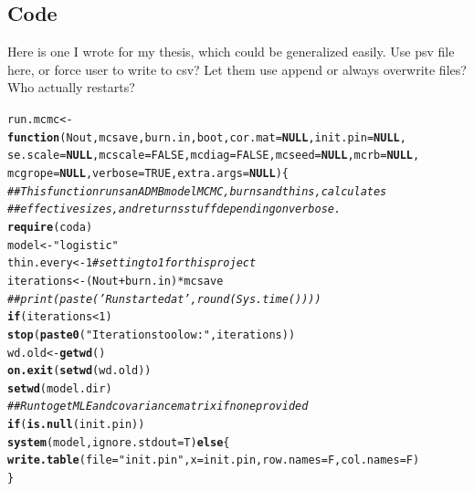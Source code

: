 \documentclass{article}\usepackage[]{graphicx}\usepackage[]{color}
\makeatletter
\newcommand{\hlnum}[1]{\textcolor[rgb]{0.686,0.059,0.569}{#1}}%
\newcommand{\hlstr}[1]{\textcolor[rgb]{0.192,0.494,0.8}{#1}}%
\newcommand{\hlcom}[1]{\textcolor[rgb]{0.678,0.584,0.686}{\textit{#1}}}%
\newcommand{\hlopt}[1]{\textcolor[rgb]{0,0,0}{#1}}%
\newcommand{\hlstd}[1]{\textcolor[rgb]{0.345,0.345,0.345}{#1}}%
\newcommand{\hlkwa}[1]{\textcolor[rgb]{0.161,0.373,0.58}{\textbf{#1}}}%
\newcommand{\hlkwb}[1]{\textcolor[rgb]{0.69,0.353,0.396}{#1}}%
\newcommand{\hlkwc}[1]{\textcolor[rgb]{0.333,0.667,0.333}{#1}}%
\newcommand{\hlkwd}[1]{\textcolor[rgb]{0.737,0.353,0.396}{\textbf{#1}}}%
\newenvironment{kframe}{%
 \def\at@end@of@kframe{}%
 \ifinner\ifhmode%
  \def\at@end@of@kframe{\end{minipage}}%
  \begin{minipage}{\columnwidth}%
 \fi\fi%
 \def\FrameCommand##1{\hskip\@totalleftmargin \hskip-\fboxsep
 \colorbox{shadecolor}{##1}\hskip-\fboxsep
     \hskip-\linewidth \hskip-\@totalleftmargin \hskip\columnwidth}%
 \MakeFramed {\advance\hsize-\width
   \@totalleftmargin\z@ \linewidth\hsize
   \@setminipage}}%
 {\par\unskip\endMakeFramed%
 \at@end@of@kframe}
\newenvironment{knitrout}{}{} %
\makeatother
\begin{document}
\subsection{Code}
Here is one I wrote for my thesis, which could be generalized
easily. Use psv file here, or force user to write to csv? Let
them use append or always overwrite files? Who actually restarts?
\begin{knitrout}
\color{fgcolor}\begin{kframe}
\begin{alltt}
\hlstd{run.mcmc} \hlkwb{<-} \hlkwa{function}\hlstd{(}\hlkwc{Nout}\hlstd{,} \hlkwc{mcsave}\hlstd{,} \hlkwc{burn.in}\hlstd{,} \hlkwc{boot}\hlstd{,} \hlkwc{cor.mat} \hlstd{=} \hlkwa{NULL}\hlstd{,} \hlkwc{init.pin} \hlstd{=} \hlkwa{NULL}\hlstd{,}
    \hlkwc{se.scale} \hlstd{=} \hlkwa{NULL}\hlstd{,} \hlkwc{mcscale} \hlstd{=} \hlnum{FALSE}\hlstd{,} \hlkwc{mcdiag} \hlstd{=} \hlnum{FALSE}\hlstd{,} \hlkwc{mcseed} \hlstd{=} \hlkwa{NULL}\hlstd{,} \hlkwc{mcrb} \hlstd{=} \hlkwa{NULL}\hlstd{,}
    \hlkwc{mcgrope} \hlstd{=} \hlkwa{NULL}\hlstd{,} \hlkwc{verbose} \hlstd{=} \hlnum{TRUE}\hlstd{,} \hlkwc{extra.args} \hlstd{=} \hlkwa{NULL}\hlstd{) \{}
    \hlcom{## This function runs an ADMB model MCMC, burns and thins, calculates}
    \hlcom{## effective sizes, and returns stuff depending on verbose.}
    \hlkwd{require}\hlstd{(coda)}
    \hlstd{model} \hlkwb{<-} \hlstr{"logistic"}
    \hlstd{thin.every} \hlkwb{<-} \hlnum{1}  \hlcom{# setting to 1 for this project}
    \hlstd{iterations} \hlkwb{<-} \hlstd{(Nout} \hlopt{+} \hlstd{burn.in)} \hlopt{*} \hlstd{mcsave}
    \hlcom{## print(paste('Run started at', round(Sys.time())))}
    \hlkwa{if} \hlstd{(iterations} \hlopt{<} \hlnum{1}\hlstd{)}
        \hlkwd{stop}\hlstd{(}\hlkwd{paste0}\hlstd{(}\hlstr{"Iterations too low: "}\hlstd{, iterations))}
    \hlstd{wd.old} \hlkwb{<-} \hlkwd{getwd}\hlstd{()}
    \hlkwd{on.exit}\hlstd{(}\hlkwd{setwd}\hlstd{(wd.old))}
    \hlkwd{setwd}\hlstd{(model.dir)}
    \hlcom{## Run to get MLE and covariance matrix if none provided}
    \hlkwa{if} \hlstd{(}\hlkwd{is.null}\hlstd{(init.pin))}
        \hlkwd{system}\hlstd{(model,} \hlkwc{ignore.stdout} \hlstd{= T)} \hlkwa{else} \hlstd{\{}
        \hlkwd{write.table}\hlstd{(}\hlkwc{file} \hlstd{=} \hlstr{"init.pin"}\hlstd{,} \hlkwc{x} \hlstd{= init.pin,} \hlkwc{row.names} \hlstd{= F,} \hlkwc{col.names} \hlstd{= F)}
    \hlstd{\}}


\end{alltt}
\end{kframe}
\end{knitrout}
\end{document}
